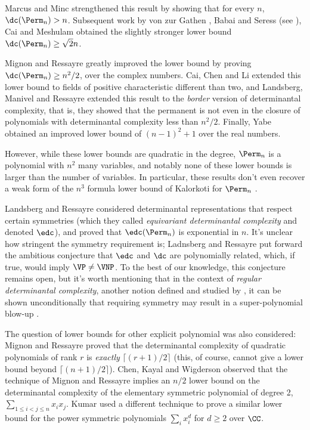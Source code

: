 Marcus and Minc \cite{MM61} strengthened this result by showing that for every $n$, $\dc(\Perm_n) > n$. Subsequent work by von zur Gathen \cite{vzG87}, Babai and Seress (see \cite{vzG87}), Cai \cite{Cai90} and Meshulam \cite{Meshulam} obtained the slightly stronger lower bound $\dc(\Perm_n) \ge \sqrt{2}n$.

Mignon and Ressayre \cite{MR04} greatly improved the lower bound by proving $\dc(\Perm_n) \ge n^2/2$, over the complex numbers. Cai, Chen and Li \cite{CCL10} extended this lower bound to fields of positive characteristic different than two, and Landsberg, Manivel and Ressayre \cite{LMR13} extended this result to the \emph{border} version of determinantal complexity, that is, they showed that the permanent is not even in the closure of polynomials with determinantal complexity less than $n^2/2$. Finally, Yabe \cite{Yabe} obtained an improved lower bound of $(n-1)^2+1$ over the real numbers.

However, while these lower bounds are quadratic in the degree, $\Perm_n$ is a polynomial with $n^2$ many variables, and notably none of these lower bounds is larger than the number of variables. In particular, these results don't even recover a weak form of the $n^3$ formula lower bound of Kalorkoti for $\Perm_n$ \cite{K85}.

Landsberg and Ressayre \cite{LR17} considered determinantal representations that respect certain symmetries (which they called \emph{equivariant determinantal complexity} and denoted $\edc$), and proved that $\edc(\Perm_n)$ is exponential in $n$. It's unclear how stringent the symmetry requirement is; Ladnsberg and Ressayre put forward the ambitious conjecture that $\edc$ and $\dc$ are polynomially related, which, if true, would imply $\VP \neq \VNP$. To the best of our knowledge, this conjecture remains open, but it's worth mentioning that in the context of \emph{regular determinantal complexity}, another notion defined and studied by \cite{LR17}, it can be shown unconditionally that requiring symmetry may result in a super-polynomial blow-up \cite{IL17}.

The question of lower bounds for other explicit polynomial was also considered: Mignon and Ressayre \cite{MR04} proved that the determinantal complexity of quadratic polynomials of rank $r$ is \emph{exactly} $\lceil (r+1)/2 \rceil$ (this, of course, cannot give a lower bound beyond $\lceil (n +1)/2 \rceil$). Chen, Kayal and Wigderson \cite{CKW11} observed that the technique of Mignon and Ressayre implies an $n/2$ lower bound on the determinantal complexity of the elementary symmetric polynomial of degree 2, $\sum_{1 \le i < j \le n} x_i x_j$. Kumar \cite{K19} used a different technique to prove a similar lower bound for the power symmetric polynomials $\sum_i x_i^d$ for $d \ge 2$ over $\CC$.

